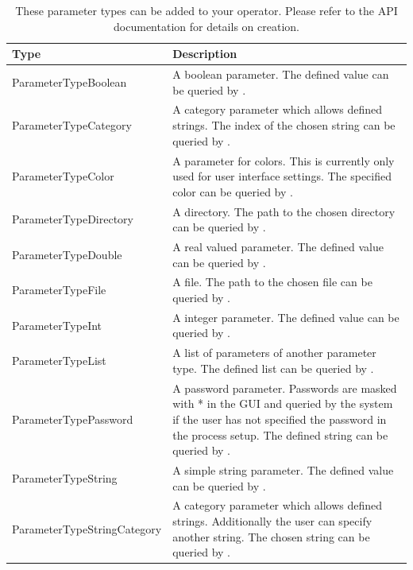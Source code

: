 \renewcommand{\tabularxcolumn}[1]{p{#1}}
\begin{table}[htbp]
  \begin{tabularx}{\linewidth}{|Z|Y|}
    \hline
    \textbf{Type}                  & \textbf{Description} \\
    \hline\hline
    ParameterTypeBoolean   & A boolean parameter. The defined value can be queried by
    . \\
    \hline
    ParameterTypeCategory  & A category parameter which allows defined
    strings. The index of the chosen string can be queried by
    . \\
    \hline
    ParameterTypeColor     & A parameter for colors. This is currently only
    used for user interface settings. The specified color can be queried by
    . \\
    \hline
    ParameterTypeDirectory & A directory. The path to the chosen directory
    can be queried by . \\
    \hline
    ParameterTypeDouble    & A real valued parameter. The defined value can be queried by
    . \\
    \hline
    ParameterTypeFile      & A file. The path to the chosen file can be queried
    by .\\
    \hline
    ParameterTypeInt       & A integer parameter. The defined value can be queried by
    . \\
    \hline
    ParameterTypeList      & A list of parameters of another parameter
    type. The defined list can be queried by . \\
    \hline
    ParameterTypePassword  & A password parameter. Passwords are masked with *
    in the GUI and queried by the system if the user has not specified the password in
    the process setup. The defined string can be queried by . \\
    \hline
    ParameterTypeString         & A simple string parameter. The defined value can be queried by
    . \\
    \hline
    ParameterTypeStringCategory & A category parameter which allows defined
    strings. Additionally the user can specify another string. The chosen
    string can be queried by . \\
    \hline
  \end{tabularx}
  \caption[Parameter types]{These parameter types can be added to your operator. Please refer
    to the API documentation for details on creation.}
  \label{tab:op:parametertypes}
\end{table}



